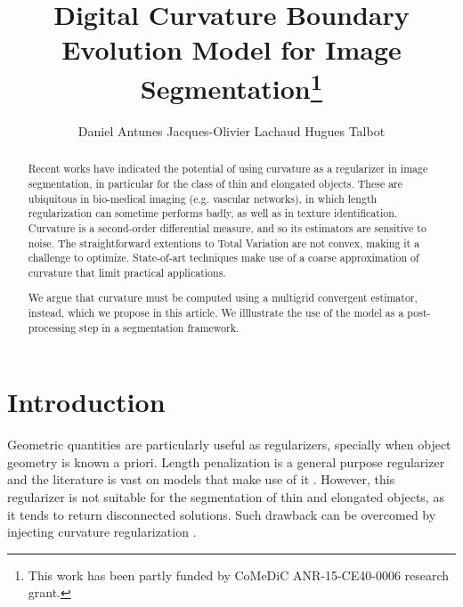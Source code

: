 \documentclass[runningheads]{llncs}
\begin{document}
%
\title{Digital Curvature Boundary Evolution Model for Image Segmentation\thanks{This  work has  been  partly  funded by CoMeDiC ANR-15-CE40-0006 research grant.}}

\author{Daniel Antunes
Jacques-Olivier Lachaud
Hugues Talbot}
%
%
%
\maketitle              %
%
\begin{abstract}
  Recent works have indicated the potential of using curvature as a
  regularizer in image segmentation, in particular for the class of
  thin and elongated objects. These are ubiquitous in bio-medical
  imaging (e.g. vascular networks), in which length regularization can
  sometime performs badly, as well as in texture
  identification. Curvature is a second-order differential measure,
  and so its estimators are sensitive to noise. The straightforward
  extentions to Total Variation are not convex, making it a challenge
  to optimize.  State-of-art techniques make use of a coarse
  approximation of curvature that limit practical applications.

  We argue that curvature must be computed
  using a multigrid convergent estimator, instead, which we propose
  in this article. We illlustrate the use of the model as a post-processing step in a
  segmentation framework.
 
\end{abstract}
%
%
%

\section{Introduction}

Geometric quantities are particularly useful as regularizers, specially when object geometry is known a priori. Length penalization is a general purpose regularizer and the literature is vast on models that make use of it \cite{casseles97,appleton05}. However, this regularizer is not suitable for the segmentation of thin and elongated objects, as it tends to return disconnected solutions. Such drawback can be overcomed by injecting curvature regularization \cite{zehiry10}.
				
\end{document}
